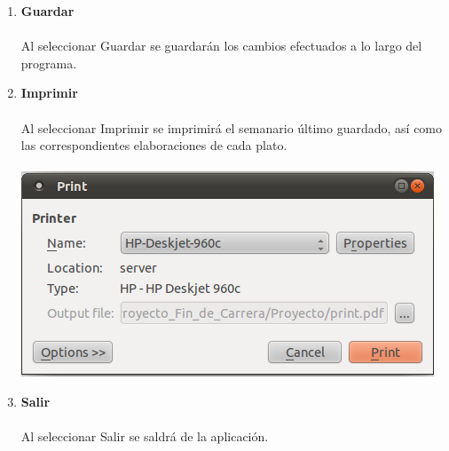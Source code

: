 \documentclass[12pt, spanish]{article}
\begin{document}
\begin{enumerate}
\item \textbf{Guardar}\\\\
Al seleccionar Guardar se guardarán los cambios efectuados a lo largo del programa.
\item \textbf{Imprimir}\\\\
Al seleccionar Imprimir se imprimirá el semanario último guardado, así como las correspondientes elaboraciones de cada plato.\\\\
\includegraphics[scale=0.5]{Image/dietista-imprimir.png}
\item \textbf{Salir}\\\\
Al seleccionar Salir se saldrá de la aplicación.\\\\
\end{enumerate}
\newpage
\end{document}
